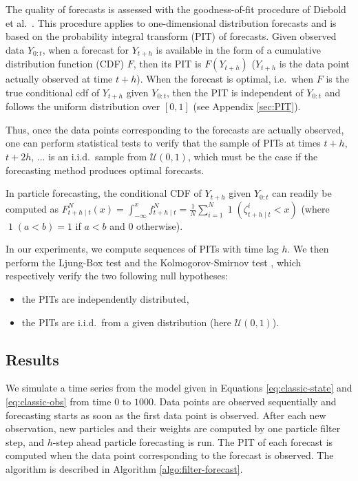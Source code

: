 \documentclass{article}
\begin{document}
The quality of forecasts is assessed with the goodness-of-fit procedure of Diebold et al.\ \cite{Diebold1998, Gneiting2014}. This procedure applies to one-dimensional distribution forecasts and is based on the probability integral transform (PIT) of forecasts. Given observed data $Y_{0:t}$, when a forecast for $Y_{t+h}$ is available in the form of a cumulative distribution function (CDF) $F$, then its PIT is $F(Y_{t+h})$ ($Y_{t+h}$ is the data point actually observed at time $t+h$). When the forecast is optimal, i.e.\ when $F$ is the true conditional cdf of $Y_{t+h}$ given $Y_{0:t}$, then the PIT is independent of $Y_{0:t}$ and follows the uniform distribution over $[0,1]$ (see Appendix \ref{sec:PIT}).

Thus, once the data points corresponding to the forecasts are actually observed, one can perform statistical tests to verify that the sample of PITs at times $t+h$, $t+2h$, ... is an i.i.d.\ sample from $\mathcal U(0,1)$, which must be the case if the forecasting method produces optimal forecasts.

In particle forecasting, the conditional CDF of $Y_{t+h}$ given $Y_{0:t}$ can readily be computed as $\displaystyle F^N_{t+h \mid t}(x) = \int_{-\infty}^x f^N_{t+h \mid t} = \frac 1N \sum_{i=1}^N \operatorname{1}(\zeta^i_{t+h \mid t} < x)$ (where $\operatorname{1}(a<b)=1$ if $a<b$ and $0$ otherwise).

In our experiments, we compute sequences of PITs with time lag $h$. We then perform the Ljung-Box test \cite{Ljung1978} and the Kolmogorov-Smirnov test \cite{Marsaglia2003}, which respectively verify the two following null hypotheses:
\begin{itemize}
    \item the PITs are independently distributed,
    \item the PITs are i.i.d.\ from a given distribution (here $\mathcal U(0,1)$).
\end{itemize}

\subsection{Results}

We simulate a time series from the model given in Equations \eqref{eq:classic-state} and \eqref{eq:classic-obs} from time $0$ to $1000$. Data points are observed sequentially and forecasting starts as soon as the first data point is observed. After each new observation, new particles and their weights are computed by one particle filter step, and $h$-step ahead particle forecasting is run. The PIT of each forecast is computed when the data point corresponding to the forecast is observed. The algorithm is described in Algorithm \ref{algo:filter-forecast}.
\end{document}
